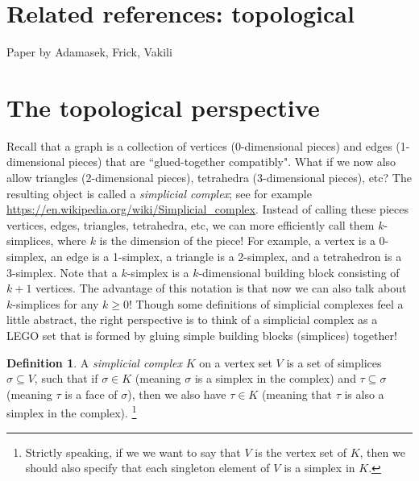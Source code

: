 \documentclass[amscd, amssymb, verbatim]{amsart}[12pt]
\theoremstyle{plain}
\theoremstyle{definition}
\newtheorem{definition}[lemma]{Definition}
\begin{document}
\section{Related references: topological}

\cite{chambers2010vietoris}

Paper by Adamasek, Frick, Vakili



\section{The topological perspective}

Recall that a graph is a collection of vertices (0-dimensional pieces) and edges (1-dimensional pieces) that are ``glued-together compatibly".
What if we now also allow triangles (2-dimensional pieces), tetrahedra (3-dimensional pieces), etc? The resulting object is called a \emph{simplicial complex}; see for example \url{https://en.wikipedia.org/wiki/Simplicial\_complex}. 
Instead of calling these pieces vertices, edges, triangles, tetrahedra, etc, we can more efficiently call them $k$-simplices, where $k$ is the dimension of the piece!
For example, a vertex is a 0-simplex, an edge is a 1-simplex, a triangle is a 2-simplex, and a tetrahedron is a 3-simplex. Note that a $k$-simplex is a $k$-dimensional building block consisting of $k+1$ vertices. The advantage of this notation is that now we can also talk about $k$-simplices for any $k\ge 0$!
Though some definitions of simplicial complexes feel a little abstract, the right perspective is to think of a simplicial complex as a LEGO set that is formed by gluing simple building blocks (simplices) together!

\begin{definition}
A \emph{simplicial complex} $K$ on a vertex set $V$ is a set of simplices $\sigma \subseteq V$, such that if $\sigma\in K$ (meaning $\sigma$ is a simplex in the complex) and $\tau\subseteq\sigma$ (meaning $\tau$ is a face of $\sigma$), then we also have $\tau\in K$ (meaning that $\tau$ is also a simplex in the complex).
\footnote{Strictly speaking, if we we want to say that $V$ is the vertex set of $K$, then we should also specify that each singleton element of $V$ is a simplex in $K$.}
\end{definition}
\end{document}
